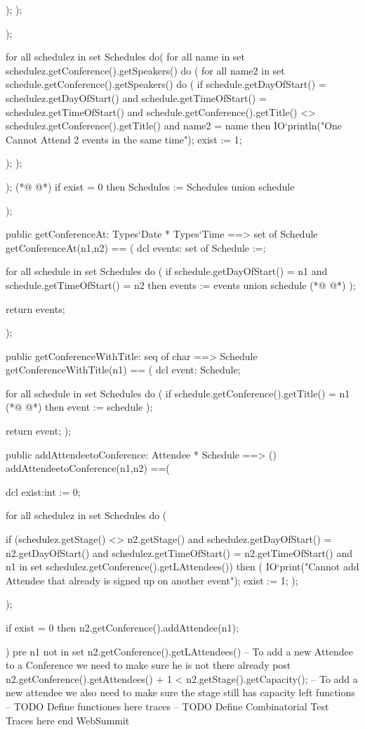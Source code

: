 \begin{vdmpp}[breaklines=true]
      
      );
    );
  
  
  );
  
    for all schedulez in set Schedules do(
    for all name in set schedulez.getConference().getSpeakers() do
    (
      for all name2 in set schedule.getConference().getSpeakers() do
      (
         if schedule.getDayOfStart() = schedulez.getDayOfStart() and schedule.getTimeOfStart() = schedulez.getTimeOfStart() and schedule.getConference().getTitle() <> schedulez.getConference().getTitle() and name2 = name
         then IO`println("One Cannot Attend 2 events in the same time");
        exist := 1;
         
      
      );
    );
  
  
  );
(*@
\label{getConferenceAt:97}
@*)
  if exist = 0 then 
  Schedules := Schedules union {schedule}

); 


public getConferenceAt: Types`Date * Types`Time ==> set of Schedule 
getConferenceAt(n1,n2) == (
       dcl events: set of Schedule :={};
       
     for all schedule in set Schedules do
      (
      if schedule.getDayOfStart() = n1 and schedule.getTimeOfStart() = n2
      then events := events union {schedule}      
(*@
\label{getConferenceWithTitle:111}
@*)
       );
       
       return events;

);

public getConferenceWithTitle: seq of char ==> Schedule
getConferenceWithTitle(n1) == (
      dcl event: Schedule;
       
     for all schedule in set Schedules do
      (
      if schedule.getConference().getTitle() = n1
(*@
\label{addAttendeetoConference:124}
@*)
      then event := schedule      
       );
       
       return event;
);

public addAttendeetoConference: Attendee * Schedule ==> ()
addAttendeetoConference(n1,n2) ==(

    dcl exist:int := 0;
    
    for all schedulez in set Schedules do
    (
     
     if (schedulez.getStage() <> n2.getStage() and schedulez.getDayOfStart() = n2.getDayOfStart() and schedulez.getTimeOfStart() = n2.getTimeOfStart() and n1 in set schedulez.getConference().getLAttendees())
      then 
      (
      IO`print("Cannot add Attendee that already is signed up on another event"); 
     exist := 1;
     );
    
    );
    
    if exist = 0
    then n2.getConference().addAttendee(n1);
    

)
pre n1 not in set n2.getConference().getLAttendees() -- To add a new Attendee to a Conference we need to make sure he is not there already
post  n2.getConference().getAttendees() + 1 < n2.getStage().getCapacity(); -- To add a new attendee we also need to make sure the stage still has capacity left
 functions
-- TODO Define functiones here
traces
-- TODO Define Combinatorial Test Traces here
end WebSummit
\end{vdmpp}
